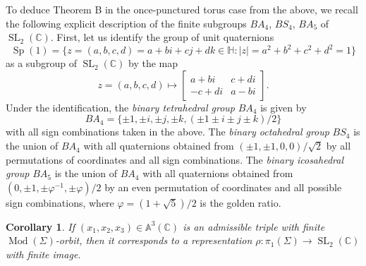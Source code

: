 \documentclass[reqno]{amsart}
\theoremstyle{plain}
\newtheorem{corollary}[theorem]{Corollary}
\theoremstyle{definition}
\theoremstyle{remark}
\newcommand{\A}{{\mathbb{A}}}
\newcommand{\C}{{\mathbb{C}}}
\renewcommand{\H}{{\mathbb{H}}}
\DeclareMathOperator{\Mod}{Mod}
\DeclareMathOperator{\SL}{SL}
\DeclareMathOperator{\Sp}{Sp}
\begin{document}
To deduce Theorem B in the once-punctured torus case from the above, we recall the following explicit description of the finite subgroups $B A_4$, $B S_4$, $B A_5$ of $\SL_2(\C)$. First, let us identify the group of unit quaternions
$$\Sp(1)=\{z=(a,b,c,d)=a+bi+cj+dk\in\H:|z|=a^2+b^2+c^2+d^2=1\}$$
as a subgroup of $\SL_2(\C)$ by the map
$$z=(a,b,c,d)\mapsto \begin{bmatrix}a+bi & c+di\\ -c+di & a-bi\end{bmatrix}.$$
Under the identification, the \emph{binary tetrahedral group} $BA_4$ is given by
$$B A_4=\{\pm1,\pm i,\pm j,\pm k,(\pm1\pm i\pm j\pm k)/2\}$$
with all sign combinations taken in the above. The \emph{binary octahedral group} $B S_4$ is the union of $B A_4$ with all quaternions obtained from $(\pm1,\pm1,0,0)/\sqrt 2$ by all permutations of coordinates and all sign combinations. The \emph{binary icosahedral group} $B A_5$ is the union of $B A_4$ with all quaternions obtained from $(0,\pm1,\pm\varphi^{-1},\pm\varphi)/2$
by an even permutation of coordinates and all possible sign combinations, where $\varphi=(1+\sqrt 5)/2$ is the golden ratio.


\begin{corollary}
\label{admcor}
If $(x_1,x_2,x_3)\in\A^3(\C)$ is an admissible triple with finite $\Mod(\Sigma)$-orbit, then it corresponds to a representation $\rho:\pi_1(\Sigma)\to \SL_2(\C)$ with  finite image.
\end{corollary}
\end{document}
